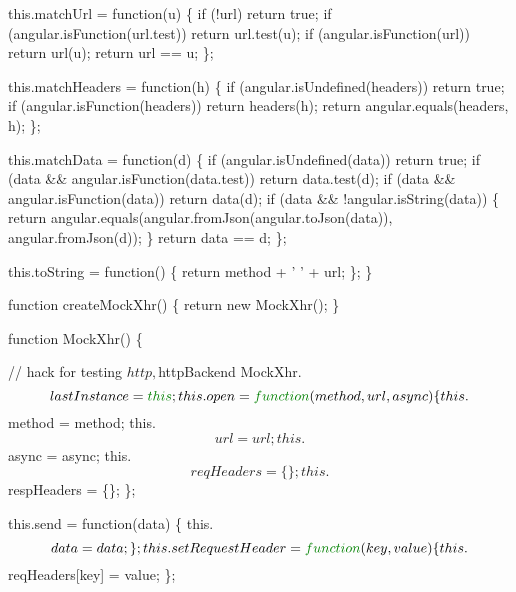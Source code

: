 \begin{DoxyCodeInclude}
  this.matchUrl = \textcolor{keyword}{function}(u) \{
    \textcolor{keywordflow}{if} (!url) \textcolor{keywordflow}{return} \textcolor{keyword}{true};
    \textcolor{keywordflow}{if} (angular.isFunction(url.test)) \textcolor{keywordflow}{return} url.test(u);
    \textcolor{keywordflow}{if} (angular.isFunction(url)) \textcolor{keywordflow}{return} url(u);
    \textcolor{keywordflow}{return} url == u;
  \};

  this.matchHeaders = \textcolor{keyword}{function}(h) \{
    \textcolor{keywordflow}{if} (angular.isUndefined(headers)) \textcolor{keywordflow}{return} \textcolor{keyword}{true};
    \textcolor{keywordflow}{if} (angular.isFunction(headers)) \textcolor{keywordflow}{return} headers(h);
    \textcolor{keywordflow}{return} angular.equals(headers, h);
  \};

  this.matchData = \textcolor{keyword}{function}(d) \{
    \textcolor{keywordflow}{if} (angular.isUndefined(data)) \textcolor{keywordflow}{return} \textcolor{keyword}{true};
    \textcolor{keywordflow}{if} (data && angular.isFunction(data.test)) \textcolor{keywordflow}{return} data.test(d);
    \textcolor{keywordflow}{if} (data && angular.isFunction(data)) \textcolor{keywordflow}{return} data(d);
    \textcolor{keywordflow}{if} (data && !angular.isString(data)) \{
      \textcolor{keywordflow}{return} angular.equals(angular.fromJson(angular.toJson(data)), angular.fromJson(d));
    \}
    \textcolor{keywordflow}{return} data == d;
  \};

  this.toString = \textcolor{keyword}{function}() \{
    \textcolor{keywordflow}{return} method + \textcolor{charliteral}{' '} + url;
  \};
\}

\textcolor{keyword}{function} createMockXhr() \{
  \textcolor{keywordflow}{return} \textcolor{keyword}{new} MockXhr();
\}

\textcolor{keyword}{function} MockXhr() \{

  \textcolor{comment}{// hack for testing $http, $httpBackend}
  MockXhr.$$lastInstance = \textcolor{keyword}{this};

  this.open = \textcolor{keyword}{function}(method, url, async) \{
    this.$$method = method;
    this.$$url = url;
    this.$$async = async;
    this.$$reqHeaders = \{\};
    this.$$respHeaders = \{\};
  \};

  this.send = \textcolor{keyword}{function}(data) \{
    this.$$data = data;
  \};

  this.setRequestHeader = \textcolor{keyword}{function}(key, value) \{
    this.$$reqHeaders[key] = value;
  \};


\end{DoxyCodeInclude}
